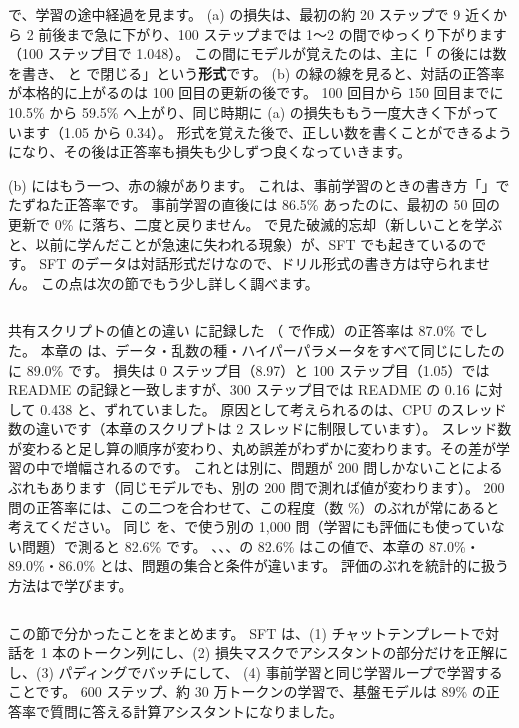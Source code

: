で、学習の途中経過を見ます。
(a) の損失は、最初の約 20 ステップで 9 近くから 2 前後まで急に下がり、100 ステップまでは 1〜2 の間でゆっくり下がります（100 ステップ目で 1.048）。
この間にモデルが覚えたのは、主に「 の後には数を書き、 と  で閉じる」という\textbf{形式}です。
(b) の緑の線を見ると、対話の正答率が本格的に上がるのは 100 回目の更新の後です。
100 回目から 150 回目までに 10.5\% から 59.5\% へ上がり、同じ時期に (a) の損失ももう一度大きく下がっています（1.05 から 0.34）。
形式を覚えた後で、正しい数を書くことができるようになり、その後は正答率も損失も少しずつ良くなっていきます。

(b) にはもう一つ、赤の線があります。
これは、事前学習のときの書き方「」でたずねた正答率です。
事前学習の直後には 86.5\% あったのに、最初の 50 回の更新で 0\% に落ち、二度と戻りません。
で見た破滅的忘却（新しいことを学ぶと、以前に学んだことが急速に失われる現象）が、SFT でも起きているのです。
SFT のデータは対話形式だけなので、ドリル形式の書き方は守られません。
この点は次の節でもう少し詳しく調べます。

\begin{column}{共有スクリプトの値との違い}
 に記録した （ で作成）の正答率は 87.0\% でした。
本章の  は、データ・乱数の種・ハイパーパラメータをすべて同じにしたのに 89.0\% です。
損失は 0 ステップ目（8.97）と 100 ステップ目（1.05）では README の記録と一致しますが、300 ステップ目では README の 0.16 に対して 0.438 と、ずれていました。
原因として考えられるのは、CPU のスレッド数の違いです（本章のスクリプトは 2 スレッドに制限しています）。
スレッド数が変わると足し算の順序が変わり、丸め誤差がわずかに変わります。その差が学習の中で増幅されるのです。
これとは別に、問題が 200 問しかないことによるぶれもあります（同じモデルでも、別の 200 問で測れば値が変わります）。
200 問の正答率には、この二つを合わせて、この程度（数 \%）のぶれが常にあると考えてください。
同じ  を、で使う別の 1,000 問（学習にも評価にも使っていない問題）で測ると 82.6\% です。
、、、の 82.6\% はこの値で、本章の 87.0\%・89.0\%・86.0\% とは、問題の集合と条件が違います。
評価のぶれを統計的に扱う方法はで学びます。
\end{column}

この節で分かったことをまとめます。
SFT は、(1) チャットテンプレートで対話を 1 本のトークン列にし、(2) 損失マスクでアシスタントの部分だけを正解にし、(3) パディングでバッチにして、
(4) 事前学習と同じ学習ループで学習することです。
600 ステップ、約 30 万トークンの学習で、基盤モデルは 89\% の正答率で質問に答える計算アシスタントになりました。

